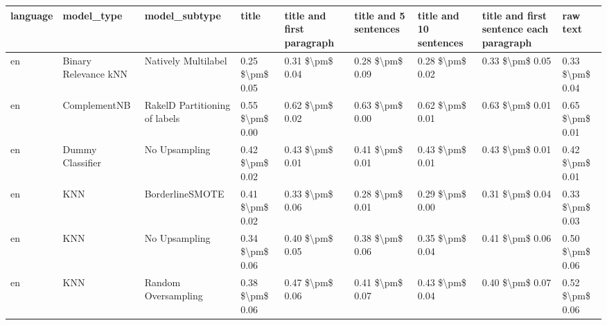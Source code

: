 \begin{tabular}{lllllllll}
\toprule
language &                      model\_type &                 model\_subtype &           title & title and first paragraph & title and 5 sentences & title and 10 sentences & title and first sentence each paragraph &            raw text \\
\midrule
      en &            Binary Relevance kNN &           Natively Multilabel & 0.25 \$\textbackslash pm\$ 0.05 &           0.31 \$\textbackslash pm\$ 0.04 &       0.28 \$\textbackslash pm\$ 0.09 &        0.28 \$\textbackslash pm\$ 0.02 &                         0.33 \$\textbackslash pm\$ 0.05 &     0.33 \$\textbackslash pm\$ 0.04 \\
      en &                    ComplementNB & RakelD Partitioning of labels & 0.55 \$\textbackslash pm\$ 0.00 &           0.62 \$\textbackslash pm\$ 0.02 &       0.63 \$\textbackslash pm\$ 0.00 &        0.62 \$\textbackslash pm\$ 0.01 &                         0.63 \$\textbackslash pm\$ 0.01 &     0.65 \$\textbackslash pm\$ 0.01 \\
      en &                Dummy Classifier &                 No Upsampling & 0.42 \$\textbackslash pm\$ 0.02 &           0.43 \$\textbackslash pm\$ 0.01 &       0.41 \$\textbackslash pm\$ 0.01 &        0.43 \$\textbackslash pm\$ 0.01 &                         0.43 \$\textbackslash pm\$ 0.01 &     0.42 \$\textbackslash pm\$ 0.01 \\
      en &                             KNN &               BorderlineSMOTE & 0.41 \$\textbackslash pm\$ 0.02 &           0.33 \$\textbackslash pm\$ 0.06 &       0.28 \$\textbackslash pm\$ 0.01 &        0.29 \$\textbackslash pm\$ 0.00 &                         0.31 \$\textbackslash pm\$ 0.04 &     0.33 \$\textbackslash pm\$ 0.03 \\
      en &                             KNN &                 No Upsampling & 0.34 \$\textbackslash pm\$ 0.06 &           0.40 \$\textbackslash pm\$ 0.05 &       0.38 \$\textbackslash pm\$ 0.06 &        0.35 \$\textbackslash pm\$ 0.04 &                         0.41 \$\textbackslash pm\$ 0.06 &     0.50 \$\textbackslash pm\$ 0.06 \\
      en &                             KNN &           Random Oversampling & 0.38 \$\textbackslash pm\$ 0.06 &           0.47 \$\textbackslash pm\$ 0.06 &       0.41 \$\textbackslash pm\$ 0.07 &        0.43 \$\textbackslash pm\$ 0.04 &                         0.40 \$\textbackslash pm\$ 0.07 &     0.52 \$\textbackslash pm\$ 0.06 \\

\end{tabular}
